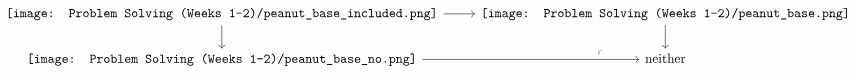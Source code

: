 \documentclass[11pt,letterpaper]{article}
\newcommand{\peanut}{\texttt{[image: Problem Solving (Weeks 1-2)/peanut\_base.png]}}
\newcommand{\nopeanut}{\texttt{[image: Problem Solving (Weeks 1-2)/peanut\_base\_no.png]}}
\newcommand{\incpeanut}{\texttt{[image: Problem Solving (Weeks 1-2)/peanut\_base\_included.png]}}
\newcommand{\neither}{\texttt{[image: Problem Solving (Weeks 1-2)/Neither.png]}}
\begin{document}
\newpage
{}
\rhead{\today}%
{} %


\[\begin{tikzcd}[ampersand replacement=\&]
	\incpeanut \& \peanut \\
	\nopeanut \& \text{neither}%
	\arrow[from=1-1, to=1-2]
	\arrow[from=1-1, to=2-1]
	\arrow[from=2-1, to=2-2]
	\arrow[from=1-2, to=2-2]
	\arrow["\lrcorner"{anchor=center, pos=0.125, rotate=180}, draw=none, from=2-2, to=1-1]
\end{tikzcd}\]
\end{document}
